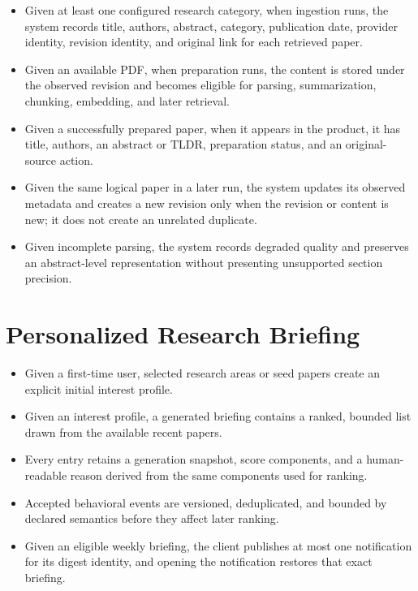\begin{itemize}
  \item Given at least one configured research category, when ingestion runs, the system records title, authors, abstract, category, publication date, provider identity, revision identity, and original link for each retrieved paper.
  \item Given an available PDF, when preparation runs, the content is stored under the observed revision and becomes eligible for parsing, summarization, chunking, embedding, and later retrieval.
  \item Given a successfully prepared paper, when it appears in the product, it has title, authors, an abstract or TLDR, preparation status, and an original-source action.
  \item Given the same logical paper in a later run, the system updates its observed metadata and creates a new revision only when the revision or content is new; it does not create an unrelated duplicate.
  \item Given incomplete parsing, the system records degraded quality and preserves an abstract-level representation without presenting unsupported section precision.
\end{itemize}

\section{Personalized Research Briefing}

\begin{itemize}
  \item Given a first-time user, selected research areas or seed papers create an explicit initial interest profile.
  \item Given an interest profile, a generated briefing contains a ranked, bounded list drawn from the available recent papers.
  \item Every entry retains a generation snapshot, score components, and a human-readable reason derived from the same components used for ranking.
  \item Accepted behavioral events are versioned, deduplicated, and bounded by declared semantics before they affect later ranking.
  \item Given an eligible weekly briefing, the client publishes at most one notification for its digest identity, and opening the notification restores that exact briefing.
\end{itemize}

